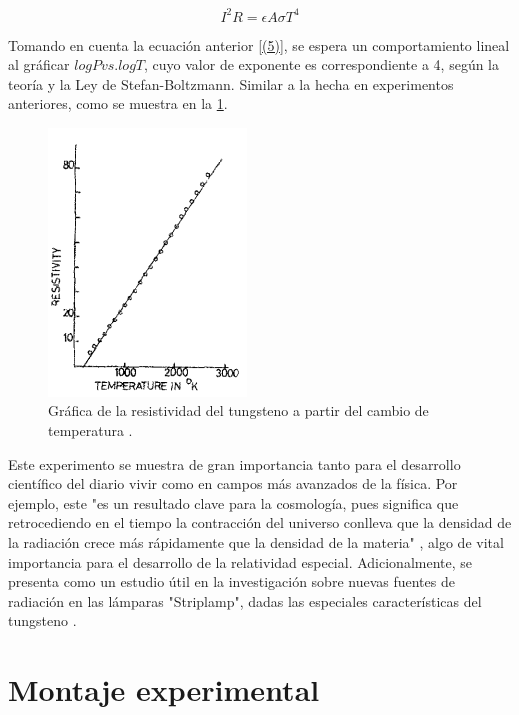 \documentclass[%
 reprint,
 amsmath,amssymb,
 aps,
]{revtex4-1}
\begin{document}
\begin{equation}\label{(5)}
  I^2 R = \epsilon A \sigma T^4
\end{equation}

Tomando en cuenta la ecuación anterior \eqref{(5)}, se espera un comportamiento lineal al gráficar $log P vs. log T$, cuyo valor de exponente es correspondiente a 4, según la teoría y la Ley de Stefan-Boltzmann. Similar a la hecha en experimentos anteriores, como se muestra en la \ref{fig:Figura 1}. 

\begin{figure}[H]
    \centering
    \includegraphics[scale= 0.5]{Resistividad_del_tungsteno.png}
    \caption{Gráfica de la resistividad del tungsteno a partir del cambio de temperatura \cite{Law}.}
    \label{fig:Figura 1}
\end{figure}

Este experimento se muestra de gran importancia tanto para el desarrollo científico del diario vivir como en campos más avanzados de la física. Por ejemplo, este "es un resultado clave para la cosmología, pues significa que retrocediendo en el tiempo la contracción del universo conlleva que la densidad de la radiación crece más rápidamente que la densidad de la materia" \cite{evolucion}, algo de vital importancia para el desarrollo de la relatividad especial. Adicionalmente, se presenta como un estudio útil en la investigación sobre nuevas fuentes de radiación en las lámparas "Striplamp", dadas las especiales características del tungsteno \cite{revisiting}.

\section{\label{sec:level1} Montaje experimental}
\end{document}

